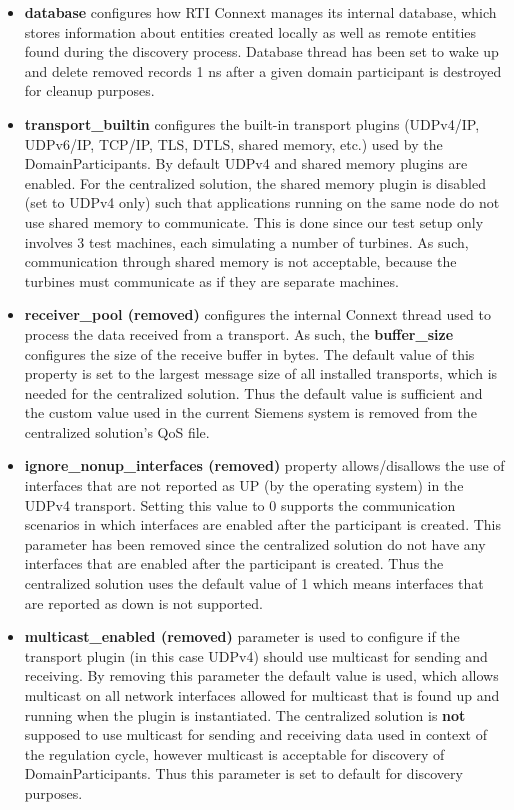 \begin{itemize}
	\item \textbf{database} configures how RTI Connext manages its internal database, which stores information about entities created locally as well as remote entities found during the discovery process. Database thread has been set to wake up and delete removed records 1 ns after a given domain participant is destroyed for cleanup purposes.
	
	\item \textbf{transport\_builtin} configures the built-in transport plugins (UDPv4/IP, UDPv6/IP, TCP/IP, TLS, DTLS, shared memory, etc.) used by the DomainParticipants. By default UDPv4 and shared memory plugins are enabled. For the centralized solution, the shared memory plugin is disabled (set to UDPv4 only) such that applications running on the same node do not use shared memory to communicate. This is done since our test setup only involves 3 test machines, each simulating a number of turbines. As such, communication through shared memory is not acceptable, because the turbines must communicate as if they are separate machines.
	
	\item \textbf{receiver\_pool (removed)} configures the internal Connext thread used to process the data received from a transport. As such, the \textbf{buffer\_size} configures the size of the receive buffer in bytes. The default value of this property is set to the largest message size of all installed transports, which is needed for the centralized solution. Thus the default value is sufficient and the custom value used in the current Siemens system is removed from the centralized solution's QoS file.
	
	\item \textbf{ignore\_nonup\_interfaces (removed)} property allows/disallows the use of interfaces that are not reported as UP (by the operating system) in the UDPv4 transport. Setting this value to 0 supports the communication scenarios in which interfaces are enabled after the participant is created. This parameter has been removed since the centralized solution do not have any interfaces that are enabled after the participant is created. Thus the centralized solution uses the default value of 1 which means interfaces that are reported as down is not supported.
	
	\item \textbf{multicast\_enabled (removed)} parameter is used to configure if the transport plugin (in this case UDPv4) should use multicast for sending and receiving. By removing this parameter the default value is used, which allows multicast on all network interfaces allowed for multicast that is found up and running when the plugin is instantiated. The centralized solution is \textbf{not} supposed to use multicast for sending and receiving data used in context of the regulation cycle, however multicast is acceptable for discovery of DomainParticipants. Thus this parameter is set to default for discovery purposes.
	

\end{itemize}
